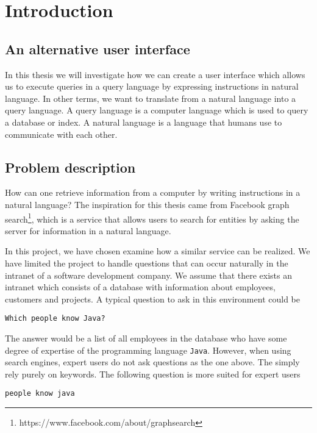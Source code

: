 \chapter{Introduction}\label{ch:introduction}
\section{An alternative user interface}
In this thesis we will investigate how we can create a user interface which allows us to execute queries in a query language by expressing instructions in natural language. In other terms, we want to translate from a natural language into a query language. A query language is a computer language which is used to query a database or index. A natural language is a language that humans use to communicate with each other.

\section{Problem description}
How can one retrieve information from a computer by writing instructions in a natural language? The inspiration for this thesis came from Facebook graph search\footnote{https://www.facebook.com/about/graphsearch}, which is a service that allows users to search for entities by asking the server for information in a natural language.

In this project, we have chosen examine how a similar service can be realized. We have limited the project to handle questions that can occur naturally in the intranet of a software development company. We assume that there exists an intranet which consists of a database with information about employees, customers and projects. A typical question to ask in this environment could be

\begin{verbatim}
Which people know Java?
\end{verbatim}

The answer would be a list of all employees in the database who have some degree of expertise of the programming language \texttt{Java}. However, when using search engines, expert users do not ask questions as the one above. The simply rely purely on keywords. The following question is more suited for expert users

\begin{verbatim}
people know java
\end{verbatim}

